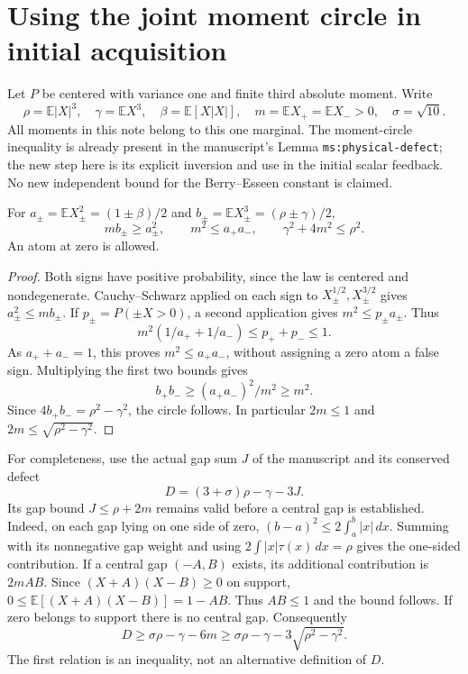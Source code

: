 \section{Using the joint moment circle in initial acquisition}
\label{v6moment:section}

Let $P$ be centered with variance one and finite third absolute moment.
Write
\[
 \rho=\mathbb E|X|^3,\quad \gamma=\mathbb EX^3,\quad
 \beta=\mathbb E[X|X|],\quad m=\mathbb EX_+=\mathbb EX_->0,
 \quad \sigma=\sqrt{10}.
\]
All moments in this note belong to this one marginal. The moment-circle
inequality is already present in the manuscript's Lemma
\texttt{ms:physical-defect}; the new step here is its explicit inversion
and use in the initial scalar feedback. No new independent bound for the
Berry--Esseen constant is claimed.

\begin{lemma}\label{v6moment:circle}
For $a_\pm=\mathbb EX_\pm^2=(1\pm\beta)/2$ and
$b_\pm=\mathbb EX_\pm^3=(\rho\pm\gamma)/2$,
\begin{equation}\label{v6moment:sign}
 mb_\pm\ge a_\pm^2,\qquad m^2\le a_+a_-,\qquad
 \gamma^2+4m^2\le\rho^2.
\end{equation}
An atom at zero is allowed.
\end{lemma}
\begin{proof}
Both signs have positive probability, since the law is centered and
nondegenerate. Cauchy--Schwarz applied on each sign to
$X_\pm^{1/2},X_\pm^{3/2}$ gives $a_\pm^2\le mb_\pm$.
If $p_\pm=P(\pm X>0)$, a second application gives
$m^2\le p_\pm a_\pm$. Thus
\[
 m^2(1/a_++1/a_-)\le p_++p_-\le1.
\]
As $a_++a_-=1$, this proves $m^2\le a_+a_-$, without assigning a zero
atom a false sign. Multiplying the first two bounds gives
\[
 b_+b_-\ge(a_+a_-)^2/m^2\ge m^2.
\]
Since $4b_+b_-=\rho^2-\gamma^2$, the circle follows. In particular
$2m\le1$ and $2m\le\sqrt{\rho^2-\gamma^2}$.
\end{proof}

For completeness, use the actual gap sum $J$ of the manuscript and its
conserved defect
\[
 D=(3+\sigma)\rho-\gamma-3J.
\]
Its gap bound $J\le\rho+2m$ remains valid before a central gap is
established. Indeed, on each gap lying on one side of zero,
$(b-a)^2\le2\int_a^b|x|\,dx$. Summing with its nonnegative gap weight
and using $2\int |x|\tau(x)\,dx=\rho$ gives the one-sided contribution.
If a central gap $(-A,B)$ exists, its additional contribution is $2mAB$.
Since $(X+A)(X-B)\ge0$ on support,
$0\le\mathbb E[(X+A)(X-B)]=1-AB$. Thus $AB\le1$ and the bound follows.
If zero belongs to support there is no central gap. Consequently
\begin{equation}\label{v6moment:defect}
 D\ge\sigma\rho-\gamma-6m
 \ge\sigma\rho-\gamma-3\sqrt{\rho^2-\gamma^2}.
\end{equation}
The first relation is an inequality, not an alternative definition of $D$.

